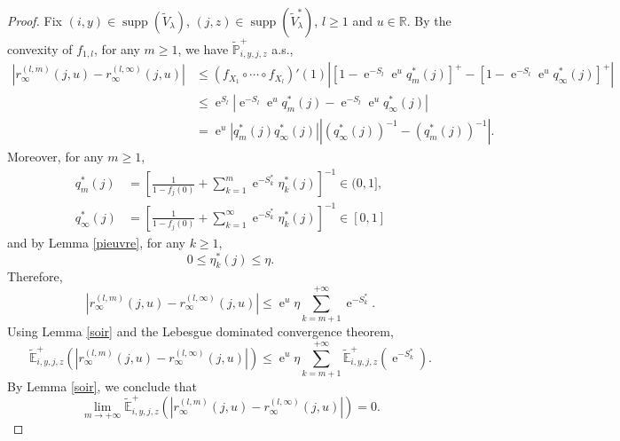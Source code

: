 \documentclass[12pt]{amsart}
\theoremstyle{definition}
\numberwithin{equation}{section}
\newcommand*{\abs}[1]{\left\lvert#1\right\rvert}
\def\bb#1{\mathbb{#1}}
\def\tt#1{\tilde{#1}}
\def\tbb#1{\tilde{\mathbb{#1}}}
\def\geq{\geqslant}
\def\leq{\leqslant}
\renewcommand\ll{\lambda}
\DeclareMathOperator{\e}{e}
\DeclareMathOperator{\supp}{supp}
\begin{document}
\begin{proof}
Fix $(i,y) \in \supp \left( \tt V_{\ll} \right)$, $(j,z) \in \supp \left( \tt V_{\ll}^* \right)$, $l\geq 1$ and $u \in \bb R$. By the convexity of $f_{1,l}$, for any $m \geq 1$, we have $\tbb P_{i,y,j,z}^+$ a.s.,
\begin{align*}
\abs{r_{\infty}^{(l,m)}(j,u) - r_{\infty}^{(l,\infty)}(j,u)} &\leq \left(f_{X_1} \circ \cdots \circ f_{X_l}\right)'(1) \abs{\left[ 1- \e^{-S_l} \e^{u} q_m^*(j) \right]^+ - \left[ 1- \e^{-S_l} \e^{u} q_{\infty}^*(j) \right]^+} \\
&\leq \e^{S_l}  \abs{\e^{-S_l} \e^{u} q_m^*(j) - \e^{-S_l} \e^{u} q_{\infty}^*(j)} \\
&= \e^{u} \abs{q_m^*(j)q_{\infty}^*(j)} \abs{ \left(q_{\infty}^*(j) \right)^{-1} - \left(q_{m}^*(j) \right)^{-1}}.
\end{align*}
Moreover, for any $m \geq 1$,
\begin{align*}
	q_m^*(j) &= \left[ \frac{1}{1-f_j(0)} + \sum_{k=1}^{m} \e^{-S_k^*} \eta_k^*(j) \right]^{-1} \in (0,1],\\
	q_{\infty}^*(j) &= \left[ \frac{1}{1-f_j(0)} + \sum_{k=1}^{\infty} \e^{-S_k^*} \eta_k^*(j) \right]^{-1} \in [0,1]
\end{align*}
and by Lemma \ref{pieuvre}, for any $k \geq 1$,
\begin{equation}
	\label{clocher001}
	0 \leq \eta_k^*(j) \leq \eta.
\end{equation}
Therefore,
\[
\abs{r_{\infty}^{(l,m)}(j,u) - r_{\infty}^{(l,\infty)}(j,u)} \leq \e^{u} \eta \sum_{k=m+1}^{+\infty} \e^{-S_k^*}.
\]
Using Lemma \ref{soir} and the Lebesgue dominated convergence theorem,
\[
\tbb E_{i,y,j,z}^+ \left( \abs{r_{\infty}^{(l,m)}(j,u) - r_{\infty}^{(l,\infty)}(j,u)} \right) \leq \e^{u} \eta \sum_{k=m+1}^{+\infty} \tbb E_{i,y,j,z}^+ \left( \e^{-S_k^*} \right).
\]
By Lemma \ref{soir}, we conclude that
\[
\lim_{m\to+\infty} \tbb E_{i,y,j,z}^+ \left( \abs{r_{\infty}^{(l,m)}(j,u) - r_{\infty}^{(l,\infty)}(j,u)} \right) = 0.
\]
\end{proof}
\end{document}
